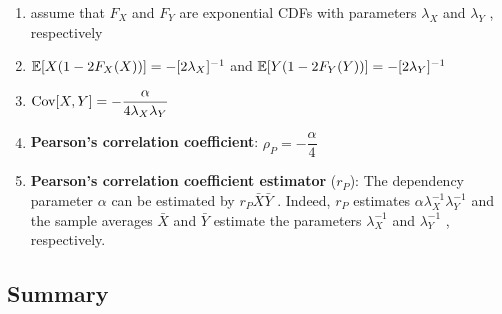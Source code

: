 \begin{enumerate}
    \item assume that $F_X$ and $F_Y$ are exponential CDFs with parameters $\lambda_X$ and $\lambda_Y$ , respectively
    \hfill \cite{statistics/book/Statistics-for-Data-Scientists/Maurits-Kaptein}

    \item $\mathbb{E}[X (1 - 2F_X (X))] = -[2\lambda_X ]^{-1}$ and $\mathbb{E}[Y (1 - 2F_Y (Y ))] = -[2\lambda_Y ]^{-1}$
    \hfill \cite{statistics/book/Statistics-for-Data-Scientists/Maurits-Kaptein}

    \item $\text{Cov}[X, Y] = -\dfrac{\alpha}{4\lambda_X \lambda_Y} $
    \hfill \cite{statistics/book/Statistics-for-Data-Scientists/Maurits-Kaptein}

    \item \textbf{Pearson’s correlation coefficient}: $\rho_P = -\dfrac{\alpha}{4}$ 
    \hfill \cite{statistics/book/Statistics-for-Data-Scientists/Maurits-Kaptein}

    \item \textbf{Pearson’s correlation coefficient estimator} ($r_P$): 
    The dependency parameter $\alpha$ can be estimated by $r_P \bar{X} \bar{Y}$ . 
    Indeed, $r_P$ estimates $\alpha\lambda^{-1}_X \lambda^{-1}_Y$ and the sample averages $\bar{X}$ and $\bar{Y}$ estimate the parameters $\lambda^{-1}_X$ and $\lambda^{-1}_Y$ , respectively.
    \hfill \cite{statistics/book/Statistics-for-Data-Scientists/Maurits-Kaptein}
\end{enumerate}


\subsection{Summary}

